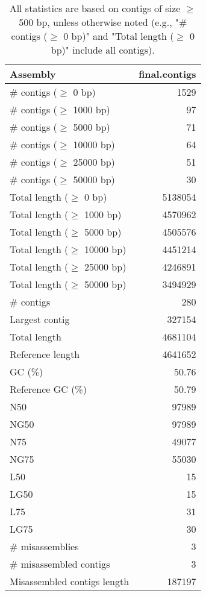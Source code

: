 \documentclass[12pt,a4paper]{article}
\begin{document}
\begin{table}[ht]
\begin{center}
\caption{All statistics are based on contigs of size $\geq$ 500 bp, unless otherwise noted (e.g., "\# contigs ($\geq$ 0 bp)" and "Total length ($\geq$ 0 bp)" include all contigs).}
\begin{tabular}{|l*{1}{|r}|}
\hline
Assembly & final.contigs \\ \hline
\# contigs ($\geq$ 0 bp) & 1529 \\ \hline
\# contigs ($\geq$ 1000 bp) & 97 \\ \hline
\# contigs ($\geq$ 5000 bp) & 71 \\ \hline
\# contigs ($\geq$ 10000 bp) & 64 \\ \hline
\# contigs ($\geq$ 25000 bp) & 51 \\ \hline
\# contigs ($\geq$ 50000 bp) & 30 \\ \hline
Total length ($\geq$ 0 bp) & 5138054 \\ \hline
Total length ($\geq$ 1000 bp) & 4570962 \\ \hline
Total length ($\geq$ 5000 bp) & 4505576 \\ \hline
Total length ($\geq$ 10000 bp) & 4451214 \\ \hline
Total length ($\geq$ 25000 bp) & 4246891 \\ \hline
Total length ($\geq$ 50000 bp) & 3494929 \\ \hline
\# contigs & 280 \\ \hline
Largest contig & 327154 \\ \hline
Total length & 4681104 \\ \hline
Reference length & 4641652 \\ \hline
GC (\%) & 50.76 \\ \hline
Reference GC (\%) & 50.79 \\ \hline
N50 & 97989 \\ \hline
NG50 & 97989 \\ \hline
N75 & 49077 \\ \hline
NG75 & 55030 \\ \hline
L50 & 15 \\ \hline
LG50 & 15 \\ \hline
L75 & 31 \\ \hline
LG75 & 30 \\ \hline
\# misassemblies & 3 \\ \hline
\# misassembled contigs & 3 \\ \hline
Misassembled contigs length & 187197 \\ \hline

\end{tabular}
\end{center}
\end{table}
\end{document}

